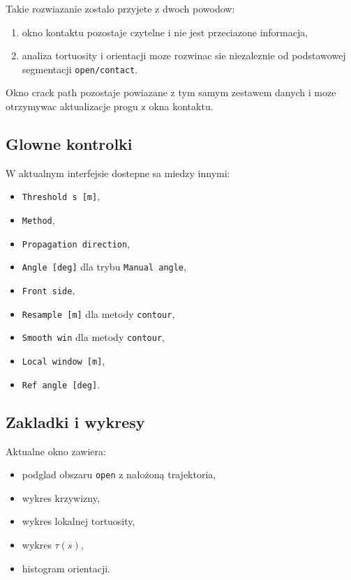 \documentclass[11pt,a4paper]{article}
\begin{document}
Takie rozwiazanie zostalo przyjete z dwoch powodow:

\begin{enumerate}[leftmargin=1.5em]
    \item okno kontaktu pozostaje czytelne i nie jest przeciazone informacja,
    \item analiza tortuosity i orientacji moze rozwinac sie niezaleznie od
    podstawowej segmentacji \texttt{open/contact}.
\end{enumerate}

Okno crack path pozostaje powiazane z tym samym zestawem danych i moze
otrzymywac aktualizacje progu z okna kontaktu.

\subsection{Glowne kontrolki}

W aktualnym interfejsie dostepne sa miedzy innymi:

\begin{itemize}[leftmargin=1.5em]
    \item \texttt{Threshold s [\textmu m]},
    \item \texttt{Method},
    \item \texttt{Propagation direction},
    \item \texttt{Angle [deg]} dla trybu \texttt{Manual angle},
    \item \texttt{Front side},
    \item \texttt{Resample [\textmu m]} dla metody \texttt{contour},
    \item \texttt{Smooth win} dla metody \texttt{contour},
    \item \texttt{Local window [\textmu m]},
    \item \texttt{Ref angle [deg]}.
\end{itemize}

\subsection{Zakladki i wykresy}

Aktualne okno zawiera:

\begin{itemize}[leftmargin=1.5em]
    \item podglad obszaru \texttt{open} z nałożoną trajektoria,
    \item wykres krzywizny,
    \item wykres lokalnej tortuosity,
    \item wykres \(\tau(s)\),
    \item histogram orientacji.
\end{itemize}
\end{document}
